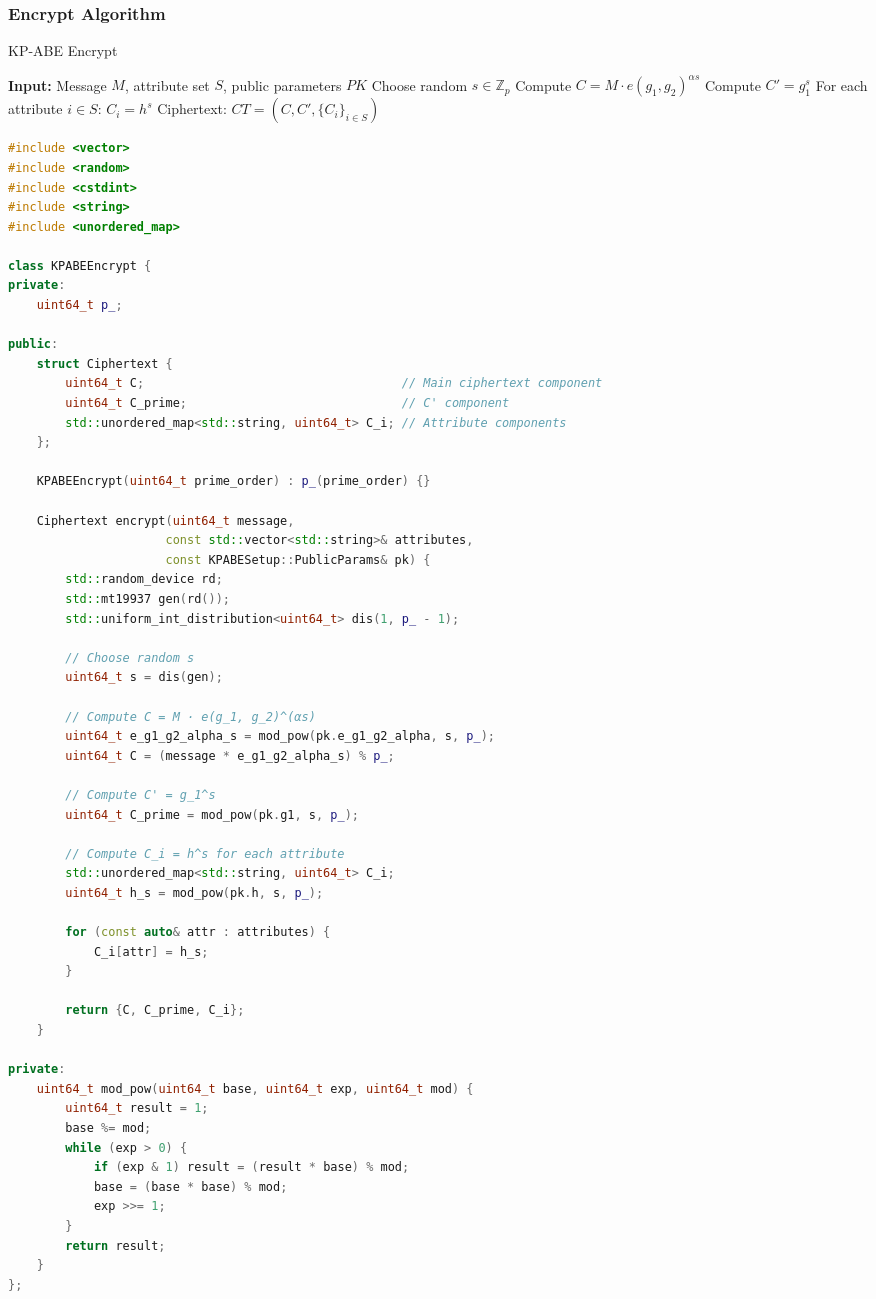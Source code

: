 \documentclass[11pt,a4paper]{article}
\begin{document}
\subsubsection{Encrypt Algorithm}

\begin{algorithm}
\caption{KP-ABE Encrypt}
\begin{algorithmic}
\STATE \textbf{Input:} Message $M$, attribute set $S$, public parameters $PK$
\STATE Choose random $s \in \mathbb{Z}_p$
\STATE Compute $C = M \cdot e(g_1, g_2)^{\alpha s}$
\STATE Compute $C' = g_1^s$
\STATE For each attribute $i \in S$: $C_i = h^s$
\STATE Ciphertext: $CT = (C, C', \{C_i\}_{i \in S})$
\end{algorithmic}
\end{algorithm}

\begin{lstlisting}[language=C++, caption=KP-ABE Encrypt Implementation]
#include <vector>
#include <random>
#include <cstdint>
#include <string>
#include <unordered_map>

class KPABEEncrypt {
private:
    uint64_t p_;
    
public:
    struct Ciphertext {
        uint64_t C;                                    // Main ciphertext component
        uint64_t C_prime;                              // C' component
        std::unordered_map<std::string, uint64_t> C_i; // Attribute components
    };
    
    KPABEEncrypt(uint64_t prime_order) : p_(prime_order) {}
    
    Ciphertext encrypt(uint64_t message, 
                      const std::vector<std::string>& attributes,
                      const KPABESetup::PublicParams& pk) {
        std::random_device rd;
        std::mt19937 gen(rd());
        std::uniform_int_distribution<uint64_t> dis(1, p_ - 1);
        
        // Choose random s
        uint64_t s = dis(gen);
        
        // Compute C = M · e(g_1, g_2)^(αs)
        uint64_t e_g1_g2_alpha_s = mod_pow(pk.e_g1_g2_alpha, s, p_);
        uint64_t C = (message * e_g1_g2_alpha_s) % p_;
        
        // Compute C' = g_1^s
        uint64_t C_prime = mod_pow(pk.g1, s, p_);
        
        // Compute C_i = h^s for each attribute
        std::unordered_map<std::string, uint64_t> C_i;
        uint64_t h_s = mod_pow(pk.h, s, p_);
        
        for (const auto& attr : attributes) {
            C_i[attr] = h_s;
        }
        
        return {C, C_prime, C_i};
    }
    
private:
    uint64_t mod_pow(uint64_t base, uint64_t exp, uint64_t mod) {
        uint64_t result = 1;
        base %= mod;
        while (exp > 0) {
            if (exp & 1) result = (result * base) % mod;
            base = (base * base) % mod;
            exp >>= 1;
        }
        return result;
    }
};
\end{lstlisting}
\end{document}
